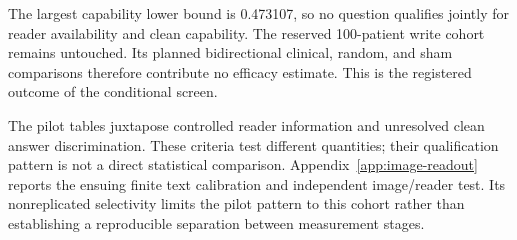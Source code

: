 \begin{table}[H]
\centering
\caption{Clean answer discrimination across the six validation questions.}
\label{tab:validation-capability}
\end{table}

The largest capability lower bound is 0.473107, so no question qualifies
jointly for reader availability and clean capability. The reserved
100-patient write cohort remains untouched. Its planned bidirectional
clinical, random, and sham comparisons therefore contribute no efficacy
estimate. This is the registered outcome of the conditional screen.

The pilot tables juxtapose controlled reader information and unresolved
clean answer discrimination. These criteria test different quantities;
their qualification pattern is not a direct statistical comparison.
Appendix~\ref{app:image-readout} reports the ensuing finite text calibration
and independent image/reader test. Its nonreplicated selectivity limits the
pilot pattern to this cohort rather than establishing a reproducible
separation between measurement stages.

\FloatBarrier
